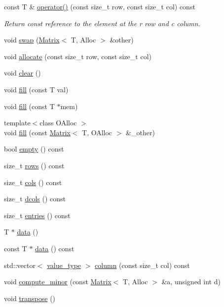 \begin{DoxyCompactItemize}
const T \& \hyperlink{classanpi_1_1Matrix_adfd71caad2eb4c7b32b93e15217dc2cd}{operator()} (const size\+\_\+t row, const size\+\_\+t col) const
\begin{DoxyCompactList}\small\item\em Return const reference to the element at the r row and c column. \end{DoxyCompactList}\item 
void \hyperlink{classanpi_1_1Matrix_a137779b37d7ececd016a16398c02ee67}{swap} (\hyperlink{classanpi_1_1Matrix}{Matrix}$<$ T, Alloc $>$ \&other)
\item 
void \hyperlink{classanpi_1_1Matrix_ad052d3579194efb15c5d98b6edc43893}{allocate} (const size\+\_\+t row, const size\+\_\+t col)
\item 
void \hyperlink{classanpi_1_1Matrix_afa6d4775f44642587dc9f7c2cfb9e1d9}{clear} ()
\item 
void \hyperlink{classanpi_1_1Matrix_a8c2b199355d418b1ef1cc2fd4490f41b}{fill} (const T val)
\item 
void \hyperlink{classanpi_1_1Matrix_a386b5f83b6e8584ed471c8a1440dfd87}{fill} (const T $\ast$mem)
\item 
{\footnotesize template$<$class O\+Alloc $>$ }\\void \hyperlink{classanpi_1_1Matrix_a05234fe0be03642e146712340321fc3d}{fill} (const \hyperlink{classanpi_1_1Matrix}{Matrix}$<$ T, O\+Alloc $>$ \&\+\_\+other)
\item 
bool \hyperlink{classanpi_1_1Matrix_ac8ba7d3cfd24775cfd9d55aed3067304}{empty} () const
\item 
size\+\_\+t \hyperlink{classanpi_1_1Matrix_a44ad72297afd1e3cf0b4586f004243f5}{rows} () const
\item 
size\+\_\+t \hyperlink{classanpi_1_1Matrix_a42d956c83ca2f25dba6397b597410c54}{cols} () const
\item 
size\+\_\+t \hyperlink{classanpi_1_1Matrix_a594c8611746bd66eb00929cb300d8679}{dcols} () const
\item 
size\+\_\+t \hyperlink{classanpi_1_1Matrix_a6734aca0aa7a6948a2ab05400df132d1}{entries} () const
\item 
T $\ast$ \hyperlink{classanpi_1_1Matrix_ae5c95a5664b8e29ead8227b3fc279d20}{data} ()
\item 
const T $\ast$ \hyperlink{classanpi_1_1Matrix_a326c01e733447563d4b1339d7fb7f07b}{data} () const
\item 
std\+::vector$<$ \hyperlink{classanpi_1_1Matrix_ad755076524c16fc494a392b0a66065cb}{value\+\_\+type} $>$ \hyperlink{classanpi_1_1Matrix_a322af2a78193e26ce71e64f271cdcbd3}{column} (const size\+\_\+t col) const
\item 
void \hyperlink{classanpi_1_1Matrix_a237d42dce09484b8caa56307d0ff1870}{compute\+\_\+minor} (const \hyperlink{classanpi_1_1Matrix}{Matrix}$<$ T, Alloc $>$ \&a, unsigned int d)
\item 
void \hyperlink{classanpi_1_1Matrix_a302741339084245047d417815cc13a62}{transpose} ()
\end{DoxyCompactItemize}

